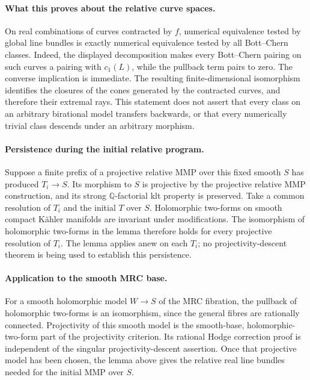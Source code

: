 \paragraph{What this proves about the relative curve spaces.}
On real combinations of curves contracted by $f$, numerical equivalence
tested by global line bundles is exactly numerical equivalence tested
by all Bott--Chern classes. Indeed, the displayed decomposition makes
every Bott--Chern pairing on such curves a pairing with $c_1(L)$, while
the pullback term pairs to zero. The converse implication is immediate.
The resulting finite-dimensional isomorphism identifies the closures
of the cones generated by the contracted curves, and therefore their
extremal rays. This statement does not assert that every class on an
arbitrary birational model transfers backwards, or that every
numerically trivial class descends under an arbitrary morphism.

\paragraph{Persistence during the initial relative program.}
Suppose a finite prefix of a projective relative MMP over this fixed
smooth $S$ has produced $T_i\to S$. Its morphism to $S$ is projective by
the projective relative MMP construction, and its strong
$\mathbb Q$-factorial klt property is preserved. Take a common
resolution of $T_i$ and the initial $T$ over $S$. Holomorphic two-forms
on smooth compact K\"ahler manifolds are invariant under modifications.
The isomorphism of holomorphic two-forms in the lemma therefore holds
for every projective resolution of $T_i$. The lemma applies anew on
each $T_i$; no projectivity-descent theorem is being used to establish
this persistence.

\paragraph{Application to the smooth MRC base.}
For a smooth holomorphic model $W\to S$ of the MRC fibration, the
pullback of holomorphic two-forms is an isomorphism, since the general
fibres are rationally connected. Projectivity of this smooth model is
the smooth-base, holomorphic-two-form part of the projectivity
criterion. Its rational Hodge correction proof is independent of the
singular projectivity-descent assertion. Once that projective model
has been chosen, the lemma above gives the relative real line bundles
needed for the initial MMP over $S$.


